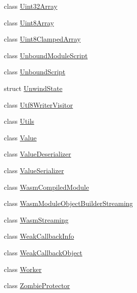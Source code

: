 \begin{DoxyCompactItemize}
\item 
class \mbox{\hyperlink{classv8_1_1Uint32Array}{Uint32\+Array}}
\item 
class \mbox{\hyperlink{classv8_1_1Uint8Array}{Uint8\+Array}}
\item 
class \mbox{\hyperlink{classv8_1_1Uint8ClampedArray}{Uint8\+Clamped\+Array}}
\item 
class \mbox{\hyperlink{classv8_1_1UnboundModuleScript}{Unbound\+Module\+Script}}
\item 
class \mbox{\hyperlink{classv8_1_1UnboundScript}{Unbound\+Script}}
\item 
struct \mbox{\hyperlink{structv8_1_1UnwindState}{Unwind\+State}}
\item 
class \mbox{\hyperlink{classv8_1_1Utf8WriterVisitor}{Utf8\+Writer\+Visitor}}
\item 
class \mbox{\hyperlink{classv8_1_1Utils}{Utils}}
\item 
class \mbox{\hyperlink{classv8_1_1Value}{Value}}
\item 
class \mbox{\hyperlink{classv8_1_1ValueDeserializer}{Value\+Deserializer}}
\item 
class \mbox{\hyperlink{classv8_1_1ValueSerializer}{Value\+Serializer}}
\item 
class \mbox{\hyperlink{classv8_1_1WasmCompiledModule}{Wasm\+Compiled\+Module}}
\item 
class \mbox{\hyperlink{classv8_1_1WasmModuleObjectBuilderStreaming}{Wasm\+Module\+Object\+Builder\+Streaming}}
\item 
class \mbox{\hyperlink{classv8_1_1WasmStreaming}{Wasm\+Streaming}}
\item 
class \mbox{\hyperlink{classv8_1_1WeakCallbackInfo}{Weak\+Callback\+Info}}
\item 
class \mbox{\hyperlink{classv8_1_1WeakCallbackObject}{Weak\+Callback\+Object}}
\item 
class \mbox{\hyperlink{classv8_1_1Worker}{Worker}}
\item 
class \mbox{\hyperlink{classv8_1_1ZombieProtector}{Zombie\+Protector}}
\end{DoxyCompactItemize}
